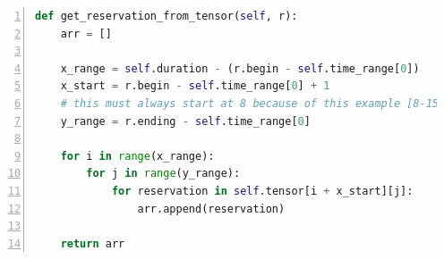 \begin{lstlisting}[language=python,caption={find\_first\_valid\_position-Methode},captionpos=b,label={lst:ffvp},escapechar=|,numbers=left]
def get_reservation_from_tensor(self, r):
    arr = []

    x_range = self.duration - (r.begin - self.time_range[0])
    x_start = r.begin - self.time_range[0] + 1
    # this must always start at 8 because of this example [8-15] and [9-10] 1 interferes with 2
    y_range = r.ending - self.time_range[0]

    for i in range(x_range):
        for j in range(y_range):
            for reservation in self.tensor[i + x_start][j]:
                arr.append(reservation)

    return arr
\end{lstlisting}
